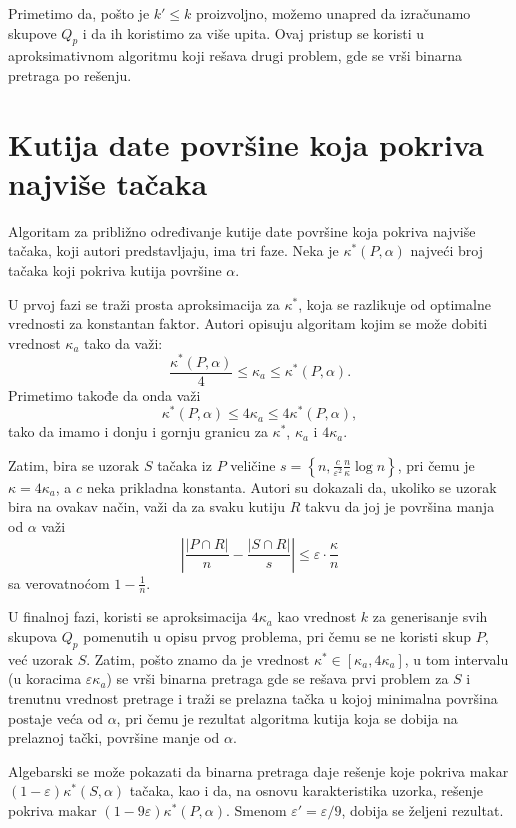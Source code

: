 \documentclass{article}
\begin{document}
Primetimo da, pošto je $k' \leqslant k$ proizvoljno, možemo unapred da izračunamo skupove $Q_p$ i da ih koristimo za više upita. Ovaj pristup se koristi u aproksimativnom algoritmu koji rešava drugi problem, gde se vrši binarna pretraga po rešenju.

\section{Kutija date površine koja pokriva najviše tačaka}

Algoritam za približno određivanje kutije date površine koja pokriva najviše tačaka, koji autori predstavljaju, ima tri faze. Neka je $\kappa^\ast (P, \alpha)$ najveći broj tačaka koji pokriva kutija površine $\alpha$.

U prvoj fazi se traži prosta aproksimacija za $\kappa^\ast$, koja se razlikuje od optimalne vrednosti za konstantan faktor. Autori opisuju algoritam kojim se može dobiti vrednost $\kappa_a$ tako da važi:
\[ \frac{\kappa^\ast (P, \alpha)}{4} \leqslant \kappa_a \leqslant \kappa^\ast (P, \alpha). \] Primetimo takođe da onda važi
\[ \kappa^\ast (P, \alpha) \leqslant 4 \kappa_a \leqslant 4 \kappa^\ast (P, \alpha) ,\] tako da imamo i donju i gornju granicu za $\kappa^\ast$, $\kappa_a$ i $4 \kappa_a$.

Zatim, bira se uzorak $S$ tačaka iz $P$ veličine $s = \left\{ n, \frac{c}{\varepsilon^2}\frac{n}{\kappa} \log n \right\}$, pri čemu je $\kappa = 4 \kappa_a$, a $c$ neka prikladna konstanta. Autori su dokazali da, ukoliko se uzorak bira na ovakav način, važi da za svaku kutiju $R$ takvu da joj je površina manja od $\alpha$ važi \[\left|\frac{\left|P \cap R\right|}{n} - \frac{\left|S \cap R\right|}{s}\right| \leqslant \varepsilon \cdot \frac{\kappa}{n}\]
sa verovatnoćom $1 - \frac{1}{n}$.

U finalnoj fazi, koristi se aproksimacija $4 \kappa_a$ kao vrednost $k$ za generisanje svih skupova $Q_p$ pomenutih u opisu prvog problema, pri čemu se ne koristi skup $P$, već uzorak $S$. Zatim, pošto znamo da je vrednost $\kappa^\ast \in \left[ \kappa_a, 4 \kappa_a \right]$, u tom intervalu (u koracima $\varepsilon \kappa_a$) se vrši binarna pretraga gde se rešava prvi problem za $S$ i trenutnu vrednost pretrage i traži se prelazna tačka u kojoj minimalna površina postaje veća od $\alpha$, pri čemu je rezultat algoritma kutija koja se dobija na prelaznoj tački, površine manje od $\alpha$.

Algebarski se može pokazati da binarna pretraga daje rešenje koje pokriva makar $(1 - \varepsilon) \kappa^\ast (S, \alpha)$ tačaka, kao i da, na osnovu karakteristika uzorka, rešenje pokriva makar $(1 - 9 \varepsilon) \kappa^\ast (P, \alpha)$. Smenom $\varepsilon' = \varepsilon / 9$, dobija se željeni rezultat.
\end{document}
